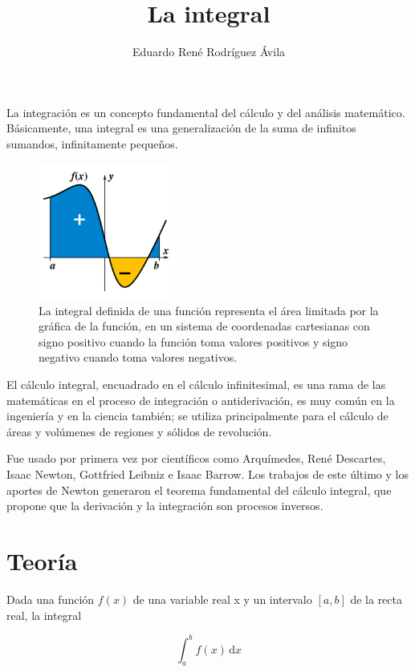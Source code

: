 \documentclass[12pt,letterpaper]{article}
\author{Eduardo René Rodríguez Ávila}
\title{La integral}
\begin{document}
	
\maketitle

La integración es un concepto fundamental del cálculo y del análisis matemático. Básicamente, una integral es una generalización de la suma de infinitos sumandos, infinitamente pequeños.

\begin{figure}[h] 
	\centering
	\includegraphics[width=0.4\textwidth]{img/integral_example.png}
	\caption{La integral definida de una función representa el área limitada por la gráfica de la función, en un sistema de coordenadas cartesianas con signo positivo cuando la función toma valores positivos y signo negativo cuando toma valores negativos.}
	\label{fig:uno}
\end{figure}

El cálculo integral, encuadrado en el cálculo infinitesimal, es una rama de las matemáticas en el proceso de integración o antiderivación, es muy común en la ingeniería y en la ciencia también; se utiliza principalmente para el cálculo de áreas y volúmenes de regiones y sólidos de revolución.

Fue usado por primera vez por científicos como Arquímedes, René Des\-car\-tes, Isaac Newton, Gottfried Leibniz e Isaac Barrow. Los trabajos de este último y los aportes de Newton generaron el teorema fundamental del cálculo integral, que propone que la derivación y la integración son procesos inversos.

\section{Teoría}

Dada una función $f(x)$ de una variable real x y un intervalo $[a,b]$ de la recta real, la integral

\begin{displaymath}
	\int_{a}^{b} f(x) \,\mathrm{d}x
\end{displaymath}
\end{document}

